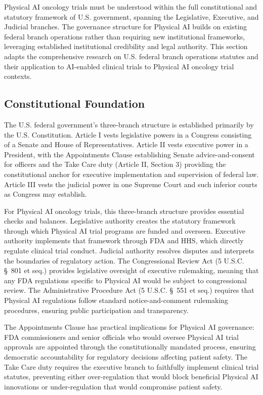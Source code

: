 
Physical AI oncology trials must be understood within the full constitutional
and statutory framework of U.S. government, spanning the Legislative, Executive,
and Judicial branches. The governance structure for Physical AI builds on
existing federal branch operations rather than requiring new institutional
frameworks, leveraging established institutional credibility and legal authority.
This section adapts the comprehensive research on U.S. federal branch operations
statutes and their application to AI-enabled clinical trials to Physical AI
oncology trial contexts.

\subsection{Constitutional Foundation}
\label{subsec:constitutional}

The U.S. federal government's three-branch structure is established primarily by
the U.S. Constitution. Article I vests legislative powers in a Congress
consisting of a Senate and House of Representatives. Article II vests executive
power in a President, with the Appointments Clause establishing Senate
advice-and-consent for officers and the Take Care duty (Article II, Section 3)
providing the constitutional anchor for executive implementation and supervision
of federal law. Article III vests the judicial power in one Supreme Court and
such inferior courts as Congress may establish.

For Physical AI oncology trials, this three-branch structure provides essential
checks and balances. Legislative authority creates the statutory framework
through which Physical AI trial programs are funded and overseen. Executive
authority implements that framework through FDA and HHS, which directly
regulate clinical trial conduct. Judicial authority resolves disputes and
interprets the boundaries of regulatory action. The Congressional Review Act
(5 U.S.C. \S~801 et seq.) provides legislative oversight of executive
rulemaking, meaning that any FDA regulations specific to Physical AI would be
subject to congressional review. The Administrative Procedure Act (5 U.S.C.
\S~551 et seq.) requires that Physical AI regulations follow standard
notice-and-comment rulemaking procedures, ensuring public participation and
transparency.

The Appointments Clause has practical implications for Physical AI governance:
FDA commissioners and senior officials who would oversee Physical AI trial
approvals are appointed through the constitutionally mandated process, ensuring
democratic accountability for regulatory decisions affecting patient safety.
The Take Care duty requires the executive branch to faithfully implement
clinical trial statutes, preventing either over-regulation that would block
beneficial Physical AI innovations or under-regulation that would compromise
patient safety.


